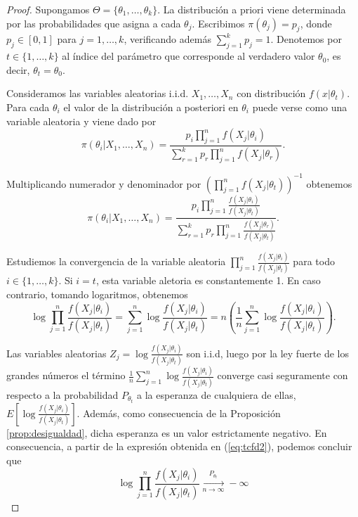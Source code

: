 \documentclass{article}
\begin{document}
\begin{proof}
	Supongamos $\Theta = \{\theta_1,\ldots,\theta_k\}$. La distribución a priori viene determinada por las probabilidades que asigna a cada $\theta_j$. Escribimos $\pi(\theta_j)=p_j$, donde $p_j\in[0,1]$ para $j=1,\ldots,k$, verificando además $\sum_{j=1}^{k}{p_j}=1$. Denotemos por $t\in\{1,\ldots,k\}$ al índice del parámetro que corresponde al verdadero valor $\theta_0$, es decir, $\theta_t = \theta_0$.


	Consideramos las variables aleatorias i.i.d. $X_1,\ldots,X_n$ con distribución $f(x|\theta_t)$. Para cada $\theta_i$ el valor de la distribución a posteriori en $\theta_i$ puede verse como una variable aleatoria y viene dado por
	\[\pi(\theta_i|X_1,\ldots,X_n) = \frac{p_i \prod_{j=1}^n{f(X_j|\theta_i)}}{\sum_{r=1}^k{p_r\prod_{j=1}^n{f(X_j|\theta_r)}}}.\]

	Multiplicando numerador y denominador por $\left(\prod_{j=1}^n{f(X_j|\theta_t)}\right)^{-1}$ obtenemos
	\begin{equation} \label{eq:tcfd1}
		\pi(\theta_i|X_1,\ldots,X_n) = \frac{p_i \prod_{j=1}^n{\frac{f(X_j|\theta_i)}{f(X_j|\theta_t)}}}{\sum_{r=1}^k{p_r\prod_{j=1}^n{\frac{f(X_j|\theta_r)}{f(X_j|\theta_t)}}}}.
	\end{equation}


	Estudiemos la convergencia de la variable aleatoria $\prod_{j=1}^n{\frac{f(X_j|\theta_i)}{f(X_j|\theta_t)}}$ para todo $i \in \{1, \ldots, k\}$. Si $i=t$, esta variable aletoria es constantemente 1. En caso contrario, tomando logaritmos, obtenemos
	\begin{equation} \label{eq:tcfd2}
	\log{\prod_{j=1}^n{\frac{f(X_j|\theta_i)}{f(X_j|\theta_t)}}} = \sum_{j=1}^{n}{ \log{\frac{f(X_j|\theta_i)}{f(X_j|\theta_t)}}} = n\left(\frac{1}{n}\sum_{j=1}^{n}{\log{\frac{f(X_j|\theta_i)}{f(X_j|\theta_t)}}}\right).
	\end{equation}

	Las variables aleatorias $Z_j = \log{\frac{f(X_j|\theta_i)}{f(X_j|\theta_t)}}$ son i.i.d, luego por la ley fuerte de los grandes números el término $\frac{1}{n}\sum_{j=1}^{n}{\log{\frac{f(X_j|\theta_i)}{f(X_j|\theta_t)}}}$ converge casi seguramente con respecto a la probabilidad $P_{\theta_t}$ a la esperanza de cualquiera de ellas, $E\left[\log{\frac{f(X_j|\theta_i)}{f(X_j|\theta_t)}}\right]$. Además, como consecuencia de la Proposición \ref{prop:desigualdad}, dicha esperanza es un valor estrictamente negativo. En consecuencia, a partir de la expresión obtenida en (\ref{eq:tcfd2}), podemos concluir que
	\[\log{\prod_{j=1}^n{\frac{f(X_j|\theta_i)}{f(X_j|\theta_t)}}} \xrightarrow[n\to\infty]{P_{\theta_t}} -\infty\]


\end{proof}
\end{document}

